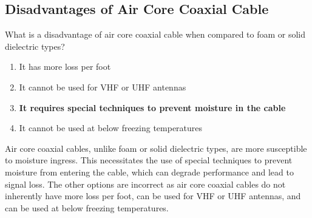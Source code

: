 \subsection{Disadvantages of Air Core Coaxial Cable}
\label{T7C11}

\begin{tcolorbox}[colback=gray!10!white,colframe=black!75!black,title=T7C11]
What is a disadvantage of air core coaxial cable when compared to foam or solid dielectric types?
\begin{enumerate}[noitemsep]
    \item It has more loss per foot
    \item It cannot be used for VHF or UHF antennas
    \item \textbf{It requires special techniques to prevent moisture in the cable}
    \item It cannot be used at below freezing temperatures
\end{enumerate}
\end{tcolorbox}

Air core coaxial cables, unlike foam or solid dielectric types, are more susceptible to moisture ingress. This necessitates the use of special techniques to prevent moisture from entering the cable, which can degrade performance and lead to signal loss. The other options are incorrect as air core coaxial cables do not inherently have more loss per foot, can be used for VHF or UHF antennas, and can be used at below freezing temperatures.